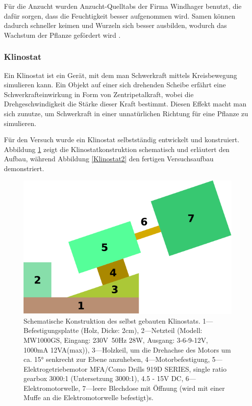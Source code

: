 \documentclass[
11pt, 
ngerman,
listof=totocnumbered,
oneside,
bibliography=totocnumbered,
abstracton
]{scrreprt}
\begin{document}
Für die Anzucht wurden Anzucht-Quelltabs der Firma Windhager benutzt, die dafür sorgen, dass die Feuchtigkeit besser aufgenommen wird. Samen können dadurch schneller keimen und Wurzeln sich besser ausbilden, wodurch das Wachstum der Pflanze gefördert wird \parencite{Windhager}. 

\subsubsection{Klinostat}

Ein Klinostat ist ein Gerät, mit dem man Schwerkraft mittels Kreisbewegung simulieren kann. Ein Objekt auf einer sich drehenden Scheibe erfährt eine Schwerkrafteinwirkung in Form von Zentripetalkraft, wobei die Drehgeschwindigkeit die Stärke dieser Kraft bestimmt. Diesen Effekt macht man sich zunutze, um Schwerkraft in einer unnatürlichen Richtung für eine Pflanze zu simulieren. 

Für den Versuch wurde ein Klinostat selbstständig entwickelt und konstruiert. Abbildung \ref{Klinstat1} zeigt die Klinostatkonstruktion schematisch und erläutert den Aufbau, während Abbildung \ref{Klinostat2} den fertigen Versuchsaufbau demonstriert. 

\begin{figure}[H]
	\centering 
	\includegraphics[width = 0.9\linewidth]{images/drawing-1.pdf}
	\caption{Schematische Konstruktion des selbst gebauten Klinostats. 1---Befestigungsplatte (Holz, Dicke: 2cm), 2---Netzteil (Modell: MW1000GS, Eingang: 230V~50Hz 28W, Ausgang: 3-6-9-12V, 1000mA 12VA(max)), 3---Holzkeil, um die Drehachse des Motors um ca. \ang{15} senkrecht zur Ebene anzuheben, 4---Motorbefestigung, 5---Elektrogetriebemotor MFA/Como Drills 919D SERIES, single ratio gearbox 3000:1 (Untersetzung 3000:1), 4.5 - 15V DC, 6---Elektromotorwelle, 7---leere Blechdose mit Öffnung (wird mit einer Muffe an die Elektromotorwelle befestigt)s\label{Klinstat1}.}
\end{figure} 
\end{document}
